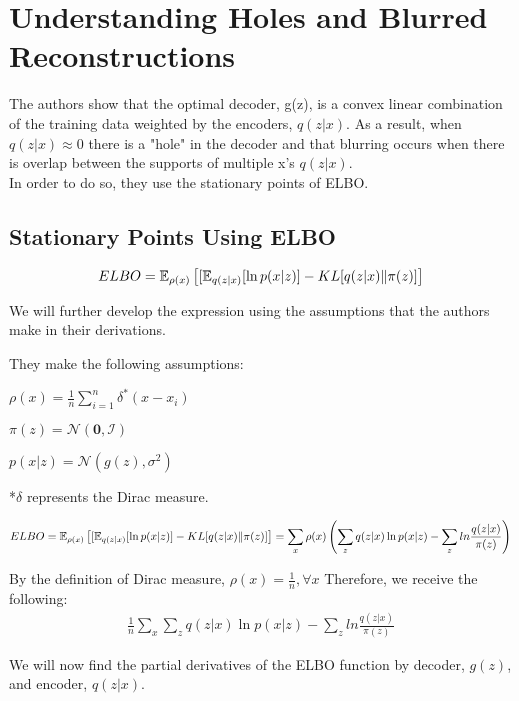 \chapter*{Understanding Holes and Blurred Reconstructions}
The authors show that the optimal decoder, g(z), is a convex linear combination of the training data weighted by the encoders, $q(z|x)$.
As a result, when $q(z|x)\approx 0$ there is a "hole" in the decoder and that blurring occurs when there is overlap between the supports of multiple x's $q(z|x)$.\\
In order to do so, they use the stationary points of ELBO.

\section*{Stationary Points Using ELBO}
\begin{gather*}
{ELBO} =  \operatorname{\mathbb{E}}_{\rho(x)}\left[[\operatorname{\mathbb{E}}_{q(z|x)}[\ln{p(x|z)}] - KL[q(z|x) \| \pi(z)]\right]
\end{gather*}

We will further develop the expression using the assumptions that the authors make in their derivations.

\raggedright
They make the following assumptions:\par

\centering
$\rho(x) = \frac{1}{n} \sum_{i=1}^{n}\delta^*(x-x_i)$

$\pi(z) = \mathcal{N}(\textbf{0}, \mathcal{I})$

$p(x|z) = \mathcal{N}(g(z), \sigma^2)$
\par

\raggedright
*$\delta$ represents the Dirac measure.
\par

\begin{gather*}
{ELBO} =  \operatorname{\mathbb{E}}_{\rho(x)}\left[[\operatorname{\mathbb{E}}_{q(z|x)}[\ln{p(x|z)}] - KL[q(z|x) \| \pi(z)]\right]
= \sum_{x}\rho(x)\left(\sum_{z} q(z|x) \ln{p(x|z)} - \sum_{z} ln \frac{q(z|x)}{\pi(z)}\right)
\end{gather*}

By the definition of Dirac measure, $\rho(x) = \frac{1}{n}, \forall x$
Therefore, we receive the following:
\begin{gather*}
\frac{1}{n}\sum_{x}\sum_{z} q(z|x) \ln{p(x|z)} - \sum_{z} ln \frac{q(z|x)}{\pi(z)}
\end{gather*}
\par

We will now find the partial derivatives of the ELBO function by decoder, $g(z)$, and encoder, $q(z|x)$.
\par

